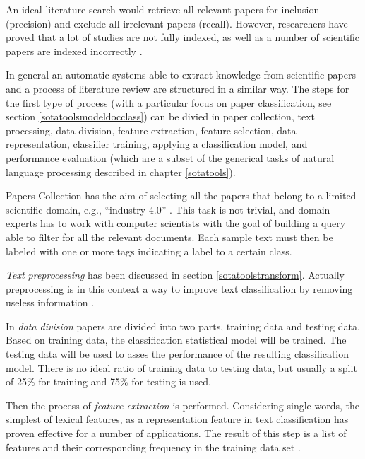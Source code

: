 \documentclass[b5paper,]{book}
\theoremstyle{definition}
\theoremstyle{definition}
\theoremstyle{definition}
\theoremstyle{remark}
\begin{document}
An ideal literature search would retrieve all relevant papers for
inclusion (precision) and exclude all irrelevant papers (recall).
However, researchers have proved that a lot of studies are not fully
indexed, as well as a number of scientific papers are indexed
incorrectly
\citep{cooper1988structure, okoli2010guide, edinger2013large}.

In general an automatic systems able to extract knowledge from
scientific papers and a process of literature review are structured in a
similar way. The steps for the first type of process (with a particular
focus on paper classification, see section \ref{sotatoolsmodeldocclass})
can be divied in paper collection, text processing, data division,
feature extraction, feature selection, data representation, classifier
training, applying a classification model, and performance evaluation
\citep{khorsheed2013comparative, weiss2010text, carlos2015text} (which
are a subset of the generical tasks of natural language processing
described in chapter \ref{sotatools}).

Papers Collection has the aim of selecting all the papers that belong to
a limited scientific domain, e.g., ``industry 4.0''
\citep{weiss2015fundamentals, chiarello2018extracting}. This task is not
trivial, and domain experts has to work with computer scientists with
the goal of building a query able to filter for all the relevant
documents. Each sample text must then be labeled with one or more tags
indicating a label to a certain class.

\emph{Text preprocessing} has been discussed in section
\ref{sotatoolstransform}. Actually preprocessing is in this context a
way to improve text classification by removing useless information
\citep[\citet{meyer2008text}]{weiss2010text}.

In \emph{data division} papers are divided into two parts, training data
and testing data. Based on training data, the classification statistical
model will be trained. The testing data will be used to asses the
performance of the resulting classification model. There is no ideal
ratio of training data to testing data, but usually a split of 25\% for
training and 75\% for testing is used.

Then the process of \emph{feature extraction} is performed. Considering
single words, the simplest of lexical features, as a representation
feature in text classification has proven effective for a number of
applications. The result of this step is a list of features and their
corresponding frequency in the training data set \citep{weiss2010text}.
\end{document}
